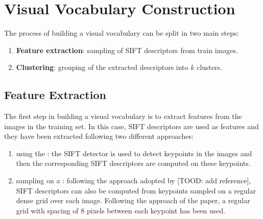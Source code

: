 \documentclass[../main.tex]{subfiles}
\begin{document}
\section{Visual Vocabulary Construction}\label{sec:visual-vocabulary-construction}

The process of building a visual vocabulary can be split in two main steps: 

\begin{enumerate}
  \item \textbf{Feature extraction}: sampling of SIFT descriptors from train images.
  \item \textbf{Clustering}: grouping of the extracted descriptors into $k$ clusters.
\end{enumerate}

\subsection{Feature Extraction}\label{subsec:feature-extraction}

The first step in building a visual vocabulary is to extract features from the images in the training set. 
In this case, SIFT descriptors are used as features and they have been extracted following two different approaches:

\begin{enumerate}
  \item using the : the SIFT detector is used to detect keypoints in the images and then the corresponding SIFT descriptors are computed on these keypoints.
  \item sampling on a : following the approach adopted by  [TOOD: add reference], SIFT descriptors can also be computed from keypoints sampled on a regular dense grid over each image. Following the approach of the paper, a regular grid with spacing of $8$ pixels between each keypoint has been used.
\end{enumerate}
\end{document}
